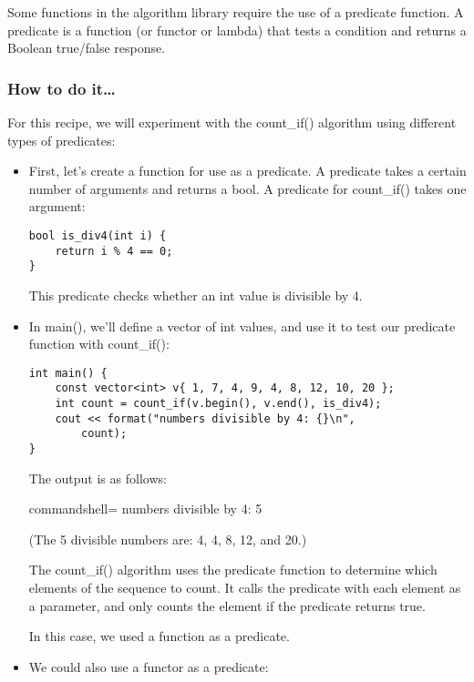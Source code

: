 
Some functions in the algorithm library require the use of a predicate function. A predicate is a function (or functor or lambda) that tests a condition and returns a Boolean true/false response.

\subsubsection{How to do it…}

For this recipe, we will experiment with the count\_if() algorithm using different types of predicates:

\begin{itemize}
\item 
First, let's create a function for use as a predicate. A predicate takes a certain number of arguments and returns a bool. A predicate for count\_if() takes one argument:

\begin{lstlisting}[style=styleCXX]
bool is_div4(int i) {
	return i % 4 == 0;
}
\end{lstlisting}

This predicate checks whether an int value is divisible by 4.

\item 
In main(), we'll define a vector of int values, and use it to test our predicate function with count\_if():

\begin{lstlisting}[style=styleCXX]
int main() {
	const vector<int> v{ 1, 7, 4, 9, 4, 8, 12, 10, 20 };
	int count = count_if(v.begin(), v.end(), is_div4);
	cout << format("numbers divisible by 4: {}\n",
		count);
}
\end{lstlisting}

The output is as follows:

\begin{tcblisting}{commandshell={}}
numbers divisible by 4: 5
\end{tcblisting}

(The 5 divisible numbers are: 4, 4, 8, 12, and 20.) 

The count\_if() algorithm uses the predicate function to determine which elements of the sequence to count. It calls the predicate with each element as a parameter, and only counts the element if the predicate returns true.

In this case, we used a function as a predicate.

\item 
We could also use a functor as a predicate:


\end{itemize}
